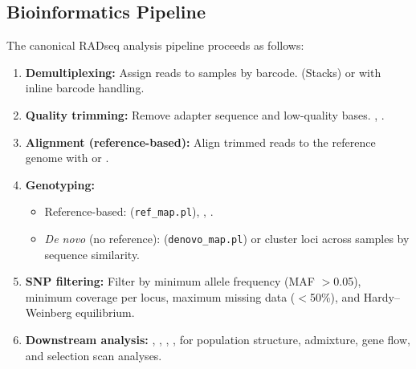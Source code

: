 \subsection{Bioinformatics Pipeline}
\label{subsec:radseq:bioinformatics}

The canonical RADseq analysis pipeline proceeds as follows:

\begin{enumerate}[nosep]
  \item \textbf{Demultiplexing:} Assign reads to samples by barcode.  (Stacks) or  with inline barcode handling.
  \item \textbf{Quality trimming:} Remove adapter sequence and low-quality bases. , .
  \item \textbf{Alignment (reference-based):} Align trimmed reads to the reference genome with  or .
  \item \textbf{Genotyping:}
    \begin{itemize}[nosep]
      \item Reference-based:  (\texttt{ref\_map.pl}), , .
      \item \textit{De novo} (no reference):  (\texttt{denovo\_map.pl}) or  cluster loci across samples by sequence similarity.
    \end{itemize}
  \item \textbf{SNP filtering:} Filter by minimum allele frequency (MAF $>$0.05), minimum coverage per locus, maximum missing data ($<$50\%), and Hardy--Weinberg equilibrium.
  \item \textbf{Downstream analysis:} , , , ,  for population structure, admixture, gene flow, and selection scan analyses.
\end{enumerate}

